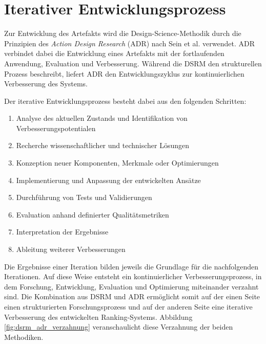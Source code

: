 \section{Iterativer Entwicklungsprozess} 

Zur Entwicklung des Artefakts wird die Design-Science-Methodik durch die Prinzipien des \textit{Action Design Research} (ADR) nach Sein et al. \citeyearpar{sein2011adr} verwendet.
ADR verbindet dabei die Entwicklung eines Artefakts mit der fortlaufenden Anwendung, Evaluation und Verbesserung. 
Während die DSRM den strukturellen Prozess beschreibt, liefert ADR den Entwicklungszyklus zur kontinuierlichen Verbesserung des Systems. 

Der iterative Entwicklungsprozess besteht dabei aus den folgenden Schritten: 

\begin{enumerate} 
    \item Analyse des aktuellen Zustands und Identifikation von Verbesserungspotentialen 
    \item Recherche wissenschaftlicher und technischer Lösungen
    \item Konzeption neuer Komponenten, Merkmale oder Optimierungen
    \item Implementierung und Anpassung der entwickelten Ansätze 
    \item Durchführung von Tests und Validierungen 
    \item Evaluation anhand definierter Qualitätsmetriken 
    \item Interpretation der Ergebnisse 
    \item Ableitung weiterer Verbesserungen
\end{enumerate} 

Die Ergebnisse einer Iteration bilden jeweils die Grundlage für die nachfolgenden Iterationen. Auf diese Weise entsteht ein kontinuierlicher Verbesserungsprozess, in dem Forschung, Entwicklung, Evaluation und Optimierung miteinander verzahnt sind. 
Die Kombination aus DSRM und ADR ermöglicht somit auf der einen Seite einen strukturierten Forschungsprozess und auf der anderen Seite eine iterative Verbesserung des entwickelten Ranking-Systems. 
Abbildung \ref{fig:dsrm_adr_verzahnung} veranschaulicht diese Verzahnung der beiden Methodiken.

